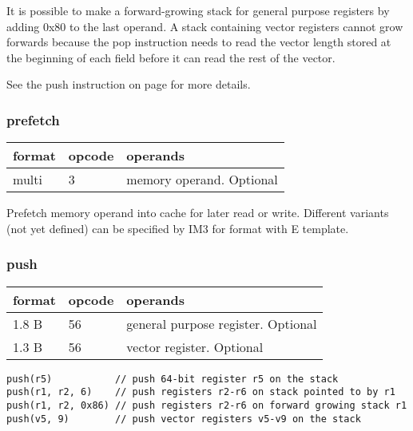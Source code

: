 \documentclass[forwardcom.tex]{subfiles}
\begin{document}
It is possible to make a forward-growing stack for general purpose registers by adding 0x80 to the last operand. A stack containing vector registers cannot grow forwards because the pop instruction needs to read the vector length stored at the beginning of each field before it can read the rest of the vector.
\vspace{2mm}

See the push instruction on page \pageref{table:pushInstruction} for more details.
\vspace{2mm}


\subsubsection{prefetch}
\label{table:prefetchInstruction}
\begin{tabular}{|p{12mm}|p{12mm}|p{110mm}|}
\hline
\bfseries format & \bfseries opcode & \bfseries operands \\ \hline
multi & 3 & memory operand. Optional \\ \hline
\end{tabular}
\vspace{2mm}

Prefetch memory operand into cache for later read or write.
Different variants (not yet defined) can be specified by IM3 for format with E template.
\vspace{2mm}


\subsubsection{push}
\label{table:pushInstruction}
\begin{tabular}{|p{12mm}|p{12mm}|p{110mm}|}
\hline
\bfseries format & \bfseries opcode & \bfseries operands \\ \hline
1.8 B & 56 & general purpose register. Optional \\ 
1.3 B & 56 & vector register. Optional \\ \hline
\end{tabular}
\vspace{2mm}

\begin{lstlisting}[frame=none]
push(r5)           // push 64-bit register r5 on the stack
push(r1, r2, 6)    // push registers r2-r6 on stack pointed to by r1
push(r1, r2, 0x86) // push registers r2-r6 on forward growing stack r1
push(v5, 9)        // push vector registers v5-v9 on the stack
\end{lstlisting}
\vspace{2mm}
\end{document}
